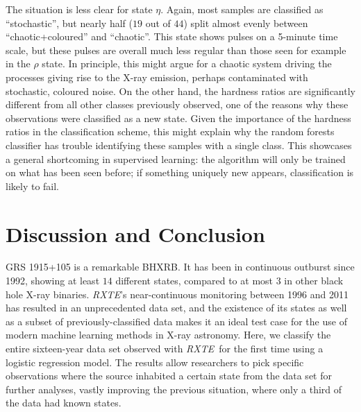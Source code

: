 \documentclass[12pt]{emulateapj}
\newcommand{\project}[1]{\textsl{#1}}
\newcommand{\rxte}{\project{RXTE}}
\begin{document}
The situation is less clear for state $\eta$. Again, most samples are classified as ``stochastic'', but nearly half ($19$ out of $44$) split almost evenly between 
``chaotic+coloured'' and ``chaotic''. This state shows pulses on a 5-minute time scale, but these pulses are overall much less regular than those 
seen for example in the $\rho$ state. In principle, this  might argue for a chaotic system driving the processes giving rise to the X-ray emission, perhaps contaminated 
with stochastic, coloured noise. On the other hand, the hardness ratios are significantly different from all other classes previously observed, one of the reasons why 
these observations were classified as a new state. Given the importance of the hardness ratios in the classification scheme, this might explain why the 
random forests classifier has trouble identifying these samples with a single class. This showcases a general shortcoming in supervised learning: the algorithm will only 
be trained on what has been seen before; if something uniquely new appears, classification is likely to fail.


\section{Discussion and Conclusion}
\label{sec:discussion}

GRS 1915+105 is a remarkable BHXRB. It has been in continuous outburst since 1992, showing at least $14$ different states, compared to at most 
$3$ in other black hole X-ray binaries.
\rxte's near-continuous monitoring between 1996 and 2011 has resulted in an unprecedented data set, and the existence of its states as well as a subset of previously-classified data makes it an ideal test case for the use of modern machine learning methods in X-ray astronomy.
Here, we classify the entire sixteen-year data set observed with \rxte\ for the first time using a logistic regression model. 
The results allow researchers to pick specific observations where the source inhabited a certain state from the data set for further analyses, vastly improving 
the previous situation, where only a third of the data had known states.
\end{document}
